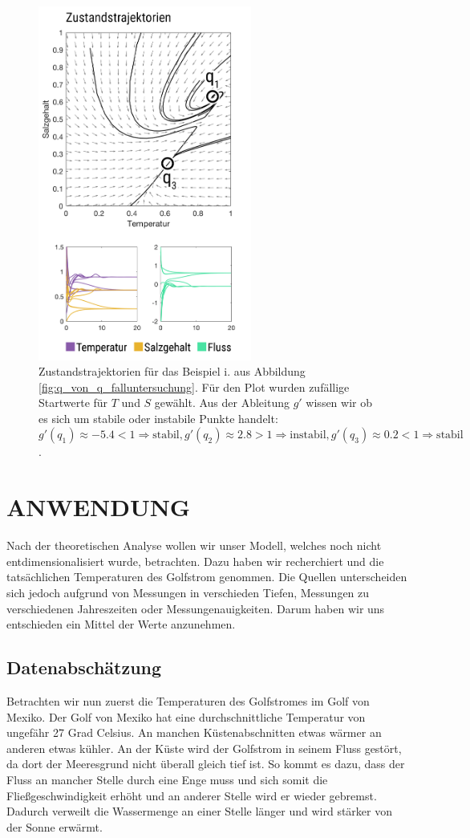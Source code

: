 \documentclass[a4paper,twoside]{article}
\begin{document}
	\begin{figure}[!h]
  		\centering
 		\includegraphics[width=7cm]{Grafiken/zustandsdiagram.png}
  		\caption{Zustandstrajektorien für das Beispiel i. aus Abbildung \ref{fig:q_von_q_falluntersuchung}. Für den Plot wurden zufällige Startwerte für \(T\) und \(S\) gewählt. Aus der Ableitung \(g'\) wissen wir ob es sich um stabile oder instabile Punkte handelt: \(g'(q_1) \approx -5.4 < 1 \Rightarrow \textrm{stabil}, g'(q_2) \approx 2.8 > 1 \Rightarrow \textrm{instabil}, g'(q_3) \approx 0.2 < 1 \Rightarrow \textrm{stabil} \). }
  		\label{fig:Zustandsraumdiagram}
	\end{figure}	
	
	\section{\uppercase{Anwendung}}\label{sec:Anwendung}
	\noindent Nach der theoretischen Analyse wollen wir unser Modell, welches noch nicht entdimensionalisiert wurde, betrachten. Dazu haben wir recherchiert und die tatsächlichen Temperaturen des Golfstrom genommen. Die Quellen unterscheiden sich jedoch aufgrund von Messungen in verschieden Tiefen, Messungen zu verschiedenen Jahreszeiten oder Messungenauigkeiten. Darum haben wir uns entschieden ein Mittel der Werte anzunehmen.
	
	\subsection{Datenabschätzung} \label{Datenabschaetzung}
	\noindent Betrachten wir nun zuerst die Temperaturen des Golfstromes im Golf von Mexiko. Der Golf von Mexiko hat eine durchschnittliche Temperatur von ungefähr 27 Grad Celsius. An manchen Küstenabschnitten etwas wärmer an anderen etwas kühler. An der Küste wird der Golfstrom in seinem Fluss gestört, da dort der Meeresgrund nicht überall gleich tief ist. So kommt es dazu, dass der Fluss an mancher Stelle durch eine Enge muss und sich somit die Fließgeschwindigkeit erhöht und an anderer Stelle wird er wieder gebremst. Dadurch verweilt die Wassermenge an einer Stelle länger und wird stärker von der Sonne erwärmt. 
	
\end{document}
